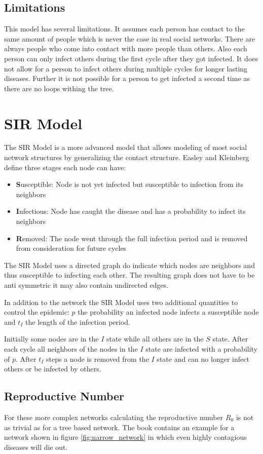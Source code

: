 \subsection{Limitations}
This model has several limitations. It assumes each person has contact to the same amount of
people which is never the case in real social networks. There are always people who come into
contact with more people than others. Also each person can only infect others during the
first cycle after they got infected. It does not allow for a person to infect others during
multiple cycles for longer lasting diseases. Further it is not possible for a person
to get infected a second time as there are no loops withing the tree.

\section{SIR Model}
The SIR Model is a more advanced model that allows modeling of most social network structures
by generalizing the contact structure. Easley and Kleinberg \cite{networks} define three 
stages each node can have:
\begin{itemize}
    \item \textbf{S}usceptible: Node is not yet infected but susceptible to infection from its neighbors
    \item \textbf{I}nfectious: Node has caught the disease and has a probability to infect its neighbors
    \item \textbf{R}emoved: The node went through the full infection period and is removed from consideration for future cycles
\end{itemize}
The SIR Model uses a directed graph do indicate which nodes are neighbors and thus susceptible 
to infecting each other. The resulting graph does not have to be anti symmetric it may also contain
undirected edges. 

In addition to the network the SIR Model uses two additional quantities to control the 
epidemic: $p$ the probability an infected node infects a susceptible node and $t_I$ the length
of the infection period.

Initially some nodes are in the $I$ state while all others are in the $S$ state. After
each cycle all neighbors of the nodes in the $I$ state are infected with a probability of $p$.
After $t_I$ steps a node is removed from the $I$ state and can no longer infect others or be
infected by others.

\subsection{Reproductive Number}
\label{sub:r0}
For these more complex networks calculating the reproductive number $R_0$ is not as trivial
as for a tree based network. The book contains an example for a network shown in figure \ref{fig:narrow_network}
in which even highly contagious diseases will die out.

